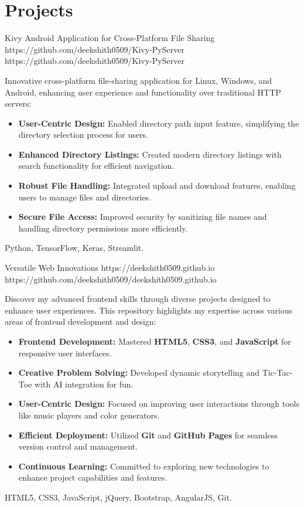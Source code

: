\documentclass[a4paper,10pt]{article}
\begin{document}
\section{Projects}
\vspace{0pt}
\projectentry
{Kivy Android Application for Cross-Platform File Sharing}
{https://github.com/deekshith0509/Kivy-PyServer}
{https://github.com/deekshith0509/Kivy-PyServer}
{Innovative cross-platform file-sharing application for Linux, Windows, and Android, enhancing user experience and functionality over traditional HTTP servers:
\begin{itemize}


\item \textbf{User-Centric Design:} Enabled directory path input feature, simplifying the directory selection process for users.
\item \textbf{Enhanced Directory Listings:} Created modern directory listings with search functionality for efficient navigation.
\item \textbf{Robust File Handling:} Integrated upload and download features, enabling users to manage files and directories.


\item \textbf{Secure File Access:} Improved security by sanitizing file names and handling directory permissions more efficiently.
\end{itemize}
}
{Python, TensorFlow, Keras, Streamlit.}

\vspace{10pt}
\projectentry
{Versatile Web Innovations}
{https://deekshith0509.github.io}
{https://github.com/deekshith0509/deekshith0509.github.io}
{Discover my advanced frontend skills through diverse projects designed to enhance user experiences. This repository highlights my expertise across various areas of frontend development and design:
\begin{itemize}
\item \textbf{Frontend Development:} Mastered \textbf{HTML5}, \textbf{CSS3}, and \textbf{JavaScript} for responsive user interfaces.
\item \textbf{Creative Problem Solving:} Developed dynamic storytelling and Tic-Tac-Toe with AI integration for fun.
\item \textbf{User-Centric Design:} Focused on improving user interactions through tools like music players and color generators.
\item \textbf{Efficient Deployment:} Utilized \textbf{Git} and \textbf{GitHub Pages} for seamless version control and management.
\item \textbf{Continuous Learning:} Committed to exploring new technologies to enhance project capabilities and features.
\end{itemize}
}{HTML5, CSS3, JavaScript, jQuery, Bootstrap, AngularJS, Git.}
\end{document}
